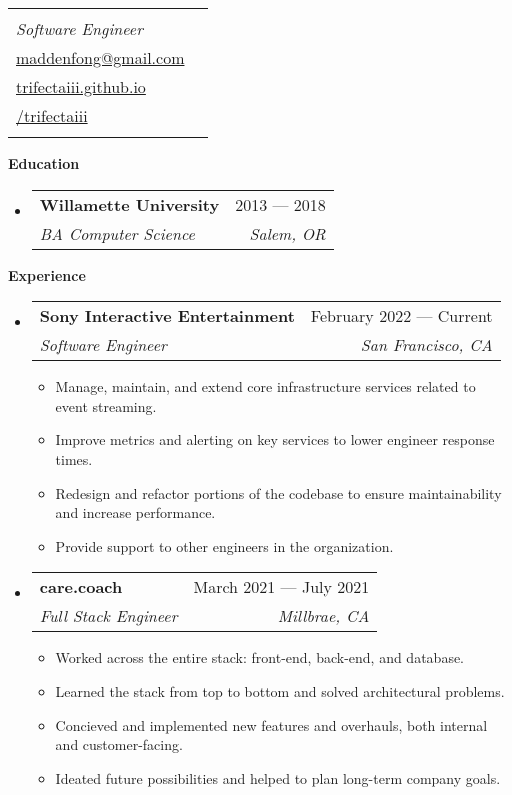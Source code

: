 \documentclass[letterpaper,12pt]{article}[leftmargin=*]
\makeatletter
\def \fullname {Dakota Madden-Fong}
\def \subtitle {Software Engineer}
\def \linkedinicon {\faLinkedin}
\def \linkedinlink {https://www.linkedin.com/in/dakota-madden-fong/}
\def \linkedintext {/dakota-madden-fong}
\def \phoneicon {\faPhone}
\def \phonetext {+1-415-810-0334}
\def \emailicon {\faEnvelope}
\def \emaillink {mailto:maddenfong@gmail.com}
\def \emailtext {maddenfong@gmail.com}
\def \githubicon {\faGithub}
\def \githublink {https://github.com/trifectaiii}
\def \githubtext {/trifectaiii}
\def \websiteicon {\faGlobe}
\def \websitelink {https://trifectaiii.github.io/}
\def \websitetext {trifectaiii.github.io}
\def \headertype {\singlecol} %
\def \entryspacing {-0pt}
\def \linkedin {\linkedinicon \hspace{3pt}\href{\linkedinlink}{\linkedintext}}
\def \phone {\phoneicon \hspace{3pt}{ \phonetext}}
\def \email {\emailicon \hspace{3pt}\href{\emaillink}{\emailtext}}
\def \github {\githubicon \hspace{3pt}\href{\githublink}{\githubtext}}
\def \website {\websiteicon \hspace{3pt}\href{\websitelink}{\websitetext}}
\renewcommand{\section}[2]{\vspace{5pt}
  \colorbox{secondary}{\color{white}\raggedbottom\normalsize\textbf{{#1}{\hspace{7pt}#2}}}
}
\newcommand{\resumeEntryStart}{\begin{itemize}[leftmargin=2.5mm]}
\newcommand{\resumeEntryEnd}{\end{itemize}\vspace{\entryspacing}}
\newcommand{\resumeItemListStart}{\begin{itemize}[leftmargin=4.5mm]}
\newcommand{\resumeItemListEnd}{\end{itemize}}
\newcommand{\resumeItem}[1]{
  \item{%
    {#1 \vspace{-2pt}}
  }
}
\newcommand{\resumeEntryTSDL}[4]{
  \vspace{-1pt}\item[]
    \begin{tabular*}{0.97\textwidth}{l@{\extracolsep{\fill}}r}
      \textbf{\color{primary}#1} & {\firabook\color{accent}\small#2} \\
      \textit{\color{accent}\small#3} & \textit{\color{accent}\small#4} \\
    \end{tabular*}\vspace{-6pt}
}
\newcommand{\doublecol}[6]{
  \begin{tabular*}{\textwidth}{l@{\extracolsep{\fill}}r}
    {
      \begin{tabular}[c]{l}
        \fontsize{35}{45}\selectfont{\color{primary}{{\textbf{\fullname}}}} \\
        {\textit{\subtitle}} %
      \end{tabular}
    } & {
      \begin{tabular}[c]{l@{\hspace{1.5em}}l}
        {\small#4} & {\small#1} \\
        {\small#5} & {\small#2} \\
        {\small#6} & {\small#3}
      \end{tabular}
    }
  \end{tabular*}
}
\newcommand{\singlecol}[4]{%
  \begin{tabular*}{\textwidth}{l@{\extracolsep{\fill}}r}
    {
      \begin{tabular}[b]{l}
        \fontsize{35}{45}\selectfont{\color{primary}{{\textbf{\fullname}}}} \\
        {\textit{\subtitle}} %
      \end{tabular}
    } & {
      \begin{tabular}[c]{l}
        {\small#1} \\
        {\small#2} \\
        {\small#3} \\
        {\small#4} \\
      \end{tabular}
    }
  \end{tabular*}
}
\makeatother
\begin{document}


\headertype{\phone}{\email}{\website}{\github}{}{} %
\vspace{-10pt} %

\section{\faGraduationCap}{Education}

  \resumeEntryStart
    \resumeEntryTSDL
      {Willamette University}{2013 --- 2018}
      {BA Computer Science}{Salem, OR}
  \resumeEntryEnd

\section{\faPieChart}{Experience}

  \resumeEntryStart
    \resumeEntryTSDL
      {Sony Interactive Entertainment}{February 2022 --- Current}
      {Software Engineer}{San Francisco, CA}
    \resumeItemListStart
      \resumeItem {Manage, maintain, and extend core infrastructure services related to event streaming.}
      \resumeItem {Improve metrics and alerting on key services to lower engineer response times.}
      \resumeItem {Redesign and refactor portions of the codebase to ensure maintainability and increase performance.}
      \resumeItem {Provide support to other engineers in the organization.}
    \resumeItemListEnd
  \resumeEntryEnd

  \resumeEntryStart
    \resumeEntryTSDL
      {care.coach}{March 2021 --- July 2021}
      {Full Stack Engineer}{Millbrae, CA}
    \resumeItemListStart
      \resumeItem {Worked across the entire stack: front-end, back-end, and database.}
      \resumeItem {Learned the stack from top to bottom and solved architectural problems.}
      \resumeItem {Concieved and implemented new features and overhauls, both internal and customer-facing.}
      \resumeItem{Ideated future possibilities and helped to plan long-term company goals.}
    \resumeItemListEnd
  \resumeEntryEnd
\end{document}
